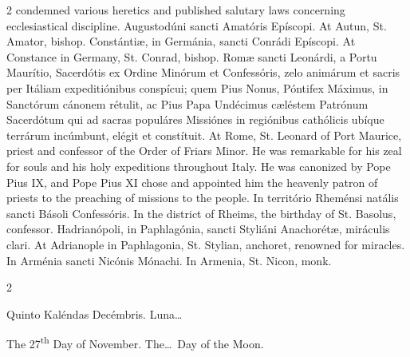 \begin{paracol}{2}
 condemned various heretics and published salutary laws concerning 
 ecclesiastical discipline.
\switchcolumn*
{}
Augustodúni sancti 
 Amatóris Epíscopi.
\switchcolumn
{}
At Autun, St. Amator, bishop.
\switchcolumn*
{}
Constántiæ, in Germánia, sancti Conrádi Epíscopi.
\switchcolumn
{}
At Constance in Germany, St. Conrad, 
 bishop.
\switchcolumn*
{}
Romæ sancti Leonárdi, a 
 Portu Maurítio, Sacerdótis ex Ordine Minórum et Confessóris, zelo animárum 
 et sacris per Itáliam expeditiónibus conspícui; quem Pius Nonus, Póntifex 
 Máximus, in Sanctórum cánonem rétulit, ac Pius Papa Undécimus cæléstem 
 Patrónum Sacerdótum qui ad sacras populáres Missiónes in regiónibus 
 cathólicis ubíque terrárum incúmbunt, elégit et constítuit.
\switchcolumn
{}
At Rome, St. Leonard of Port 
 Maurice, priest and confessor of the Order of Friars Minor. He was 
 remarkable for his zeal for souls and his holy expeditions throughout Italy. 
 He was canonized by Pope Pius IX, and Pope Pius XI chose and appointed him 
 the heavenly patron of priests to the preaching of missions to the people.
\switchcolumn*
{}
In território Rheménsi 
 natális sancti Básoli Confessóris.
\switchcolumn
{}
In the district of Rheims, the 
 birthday of St. Basolus, confessor.
\switchcolumn*
{}
Hadrianópoli, in 
 Paphlagónia, sancti Styliáni Anachorétæ, miráculis clari.
\switchcolumn
{}
At Adrianople in Paphlagonia, St. 
 Stylian, anchoret, renowned for miracles.
\switchcolumn*
{}
In Arménia sancti 
 Nicónis Mónachi.
\switchcolumn
{}
In Armenia, St. Nicon, monk.
\switchcolumn*
{}
\end{paracol}


\begin{paracol}{2}
\begin{center}{\color{gregoriocolor} Quinto Kaléndas Decémbris. 
 Luna\dots\ }\end{center}
\switchcolumn
{}
\begin{center}{\color{gregoriocolor} The 
 27\textsuperscript{th} Day of 
 November. The\dots\ Day of the Moon.}\end{center}
\end{paracol}

